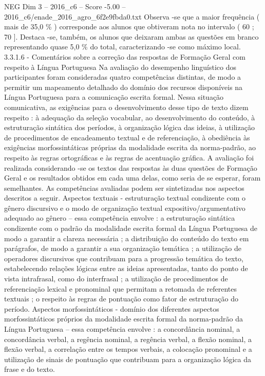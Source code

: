 \begin{textsample}{NEG Dim 3 – 2016\_c6 – Score -5.00 – 2016\_c6/enade\_2016\_agro\_6f2e9fbda0.txt}
Observa -se que a maior frequência ( mais de 35,0 \% ) corresponde aos alunos que obtiveram nota no intervalo ( 60 ; 70 ].
Destaca -se, também, os alunos que deixaram ambas as questões em branco representando quase 5,0 \% do total, caracterizando -se como máximo local. 3.3.1.6 - Comentários sobre a correção das respostas de Formação Geral com respeito à Língua Portuguesa Na avaliação do desempenho linguístico dos participantes foram consideradas quatro competências distintas, de modo a permitir um mapeamento detalhado do domínio dos recursos disponíveis na Língua Portuguesa para a comunicação escrita formal.
Nessa situação comunicativa, as exigências para o desenvolvimento desse tipo de texto dizem respeito : à adequação da seleção vocabular, ao desenvolvimento do conteúdo, à estruturação sintática dos períodos, à organização lógica das ideias, à utilização de procedimentos de encadeamento textual e de referenciação, à obediência às exigências morfossintáticas próprias da modalidade escrita da norma-padrão, ao respeito às regras ortográficas e às regras de acentuação gráfica.
A avaliação foi realizada considerando -se os textos das respostas às duas questões de Formação Geral e os resultados obtidos em cada uma delas, como seria de se esperar, foram semelhantes.
As competências avaliadas podem ser sintetizadas nos aspectos descritos a seguir.
Aspectos textuais - estruturação textual condizente com o gênero discursivo e o modo de organização textual expositivo/argumentativo adequado ao gênero – essa competência envolve : a estruturação sintática condizente com o padrão da modalidade escrita formal da Língua Portuguesa de modo a garantir a clareza necessária ; a distribuição do conteúdo do texto em parágrafos, de modo a garantir a sua organização temática ; a utilização de operadores discursivos que contribuam para a progressão temática do texto, estabelecendo relações lógicas entre as ideias apresentadas, tanto do ponto de vista intrafrasal, como do interfrasal ; a utilização de procedimentos de referenciação lexical e pronominal que permitam a retomada de referentes textuais ; o respeito às regras de pontuação como fator de estruturação do período.
Aspectos morfossintáticos - domínio dos diferentes aspectos morfossintáticos próprios da modalidade escrita formal da norma-padrão da Língua Portuguesa – essa competência envolve : a concordância nominal, a concordância verbal, a regência nominal, a regência verbal, a flexão nominal, a flexão verbal, a correlação entre os tempos verbais, a colocação pronominal e a utilização de sinais de pontuação que contribuam para a organização lógica da frase e do texto.

\end{textsample}
